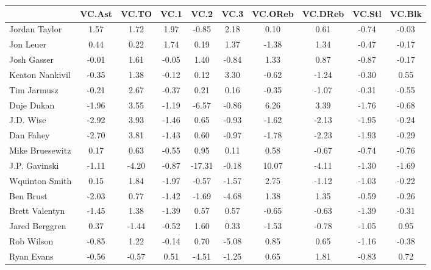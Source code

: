 \documentclass[10pt,letterpaper]{article}
\begin{document}
\begin{table}[ht]
\begin{center}
\begin{tabular}{lccccccccc}
  \hline
 & VC.Ast & VC.TO & VC.1 & VC.2 & VC.3 & VC.OReb & VC.DReb & VC.Stl & VC.Blk \\ 
  \hline
Jordan Taylor & 1.57 & 1.72 & 1.97 & -0.85 & 2.18 & 0.10 & 0.61 & -0.74 & -0.03 \\ 
  Jon Leuer & 0.44 & 0.22 & 1.74 & 0.19 & 1.37 & -1.38 & 1.34 & -0.47 & -0.17 \\ 
  Josh Gasser & -0.01 & 1.61 & -0.05 & 1.40 & -0.84 & 1.33 & 0.87 & -0.87 & -0.17 \\ 
  Keaton Nankivil & -0.35 & 1.38 & -0.12 & 0.12 & 3.30 & -0.62 & -1.24 & -0.30 & 0.55 \\ 
  Tim Jarmusz & -0.21 & 2.67 & -0.37 & 0.21 & 0.16 & -0.35 & -1.07 & -0.31 & -0.55 \\ 
  Duje Dukan & -1.96 & 3.55 & -1.19 & -6.57 & -0.86 & 6.26 & 3.39 & -1.76 & -0.68 \\ 
  J.D. Wise & -2.92 & 3.93 & -1.46 & 0.65 & -0.93 & -1.62 & -2.13 & -1.95 & -0.24 \\ 
  Dan Fahey & -2.70 & 3.81 & -1.43 & 0.60 & -0.97 & -1.78 & -2.23 & -1.93 & -0.29 \\ 
  Mike Bruesewitz & 0.17 & 0.63 & -0.55 & 0.95 & 0.11 & 0.58 & -0.67 & -0.74 & -0.76 \\ 
  J.P. Gavinski & -1.11 & -4.20 & -0.87 & -17.31 & -0.18 & 10.07 & -4.11 & -1.30 & -1.69 \\ 
  Wquinton Smith & 0.15 & 1.84 & -1.97 & -0.57 & -1.57 & 2.75 & -1.12 & -1.03 & -0.22 \\ 
  Ben Brust & -2.03 & 0.77 & -1.42 & -1.69 & -4.68 & 1.38 & 1.35 & -0.59 & -0.26 \\ 
  Brett Valentyn & -1.45 & 1.38 & -1.39 & 0.57 & 0.57 & -0.65 & -0.63 & -1.39 & -0.31 \\ 
  Jared Berggren & 0.37 & -1.44 & -0.52 & 1.60 & 0.33 & -1.53 & -0.78 & -1.05 & 0.95 \\ 
  Rob Wilson & -0.85 & 1.22 & -0.14 & 0.70 & -5.08 & 0.85 & 0.65 & -1.16 & -0.38 \\ 
  Ryan Evans & -0.56 & -0.57 & 0.51 & -4.51 & -1.25 & 0.65 & 1.81 & -0.83 & 0.72 \\ 
   \hline
\end{tabular}
\end{center}
\end{table}
\end{document}
